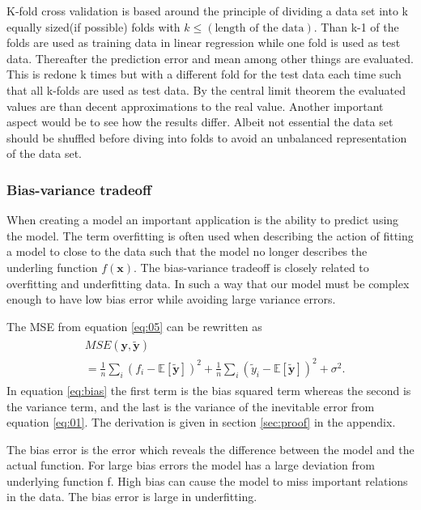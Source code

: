 \documentclass[uio,jmp,amsmath,amssymb,reprint,nofootinbib]{revtex4-1}
\numberwithin{equation}{section}
\begin{document}
K-fold cross validation is based around the principle of dividing a data set into k equally sized(if possible) folds with \(k \leq (\text{length of the data})\). Than k-1 of the folds are used as training data in linear regression while one fold is used as test data. Thereafter the prediction error and mean among other things are evaluated. This is redone k times but with a different fold for the test data each time such that all k-folds are used as test data. By the central limit theorem the evaluated values are than decent approximations to the real value. Another important aspect would be to see how the results differ. Albeit not essential the data set should be shuffled before diving into folds to avoid an unbalanced representation of the data set.


\subsubsection{Bias-variance tradeoff}

When creating a model an important application is the ability to predict using the model. The term overfitting is often used when describing the action of fitting a model to close to the data such that the model no longer describes the underling function \(f(\bm{x})\). The bias-variance tradeoff is closely related to overfitting and underfitting data. In such a way that our model must be complex enough to have low bias error while avoiding large variance errors.

The MSE from equation \ref{eq:05} can be rewritten as
\begin{align}\label{eq:bias}
\begin{split}
&MSE(\bm{y}, \bm{\tilde{y}}) \\
&= \frac{1}{n}\sum_i(f_i-\mathbb{E}\left[\boldsymbol{\tilde{y}}\right])^2+\frac{1}{n}\sum_i(\tilde{y}_i-\mathbb{E}\left[\boldsymbol{\tilde{y}}\right])^2+\sigma^2.
\end{split}
\end{align}
In equation \ref{eq:bias} the first term is the bias squared term whereas the second is the variance term, and the last is the variance of the inevitable error from equation \ref{eq:01}. The derivation is given in section \ref{sec:proof} in the appendix.

The bias error is the error which reveals the difference between the model and the actual function. For large bias errors the model has a large deviation from underlying function f. High bias can cause the model to miss important relations in the data. The bias error is large in underfitting.
\end{document}
